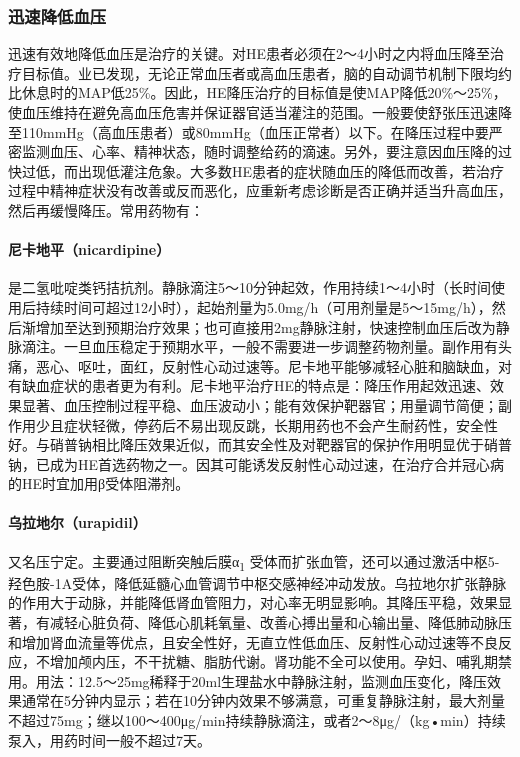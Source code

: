 \subsubsection{迅速降低血压}

迅速有效地降低血压是治疗的关键。对HE患者必须在2～4小时之内将血压降至治疗目标值。业已发现，无论正常血压者或高血压患者，脑的自动调节机制下限均约比休息时的MAP低25\%。因此，HE降压治疗的目标值是使MAP降低20\%～25\%，使血压维持在避免高血压危害并保证器官适当灌注的范围。一般要使舒张压迅速降至110mmHg（高血压患者）或80mmHg（血压正常者）以下。在降压过程中要严密监测血压、心率、精神状态，随时调整给药的滴速。另外，要注意因血压降的过快过低，而出现低灌注危象。大多数HE患者的症状随血压的降低而改善，若治疗过程中精神症状没有改善或反而恶化，应重新考虑诊断是否正确并适当升高血压，然后再缓慢降压。常用药物有：

\paragraph{尼卡地平（nicardipine）}

是二氢吡啶类钙拮抗剂。静脉滴注5～10分钟起效，作用持续1～4小时（长时间使用后持续时间可超过12小时），起始剂量为5.0mg/h（可用剂量是5～15mg/h），然后渐增加至达到预期治疗效果；也可直接用2mg静脉注射，快速控制血压后改为静脉滴注。一旦血压稳定于预期水平，一般不需要进一步调整药物剂量。副作用有头痛，恶心、呕吐，面红，反射性心动过速等。尼卡地平能够减轻心脏和脑缺血，对有缺血症状的患者更为有利。尼卡地平治疗HE的特点是：降压作用起效迅速、效果显著、血压控制过程平稳、血压波动小；能有效保护靶器官；用量调节简便；副作用少且症状轻微，停药后不易出现反跳，长期用药也不会产生耐药性，安全性好。与硝普钠相比降压效果近似，而其安全性及对靶器官的保护作用明显优于硝普钠，已成为HE首选药物之一。因其可能诱发反射性心动过速，在治疗合并冠心病的HE时宜加用β受体阻滞剂。

\paragraph{乌拉地尔（urapidil）}

又名压宁定。主要通过阻断突触后膜α\textsubscript{1}
受体而扩张血管，还可以通过激活中枢5-羟色胺-1A受体，降低延髓心血管调节中枢交感神经冲动发放。乌拉地尔扩张静脉的作用大于动脉，并能降低肾血管阻力，对心率无明显影响。其降压平稳，效果显著，有减轻心脏负荷、降低心肌耗氧量、改善心搏出量和心输出量、降低肺动脉压和增加肾血流量等优点，且安全性好，无直立性低血压、反射性心动过速等不良反应，不增加颅内压，不干扰糖、脂肪代谢。肾功能不全可以使用。孕妇、哺乳期禁用。用法：12.5～25mg稀释于20ml生理盐水中静脉注射，监测血压变化，降压效果通常在5分钟内显示；若在10分钟内效果不够满意，可重复静脉注射，最大剂量不超过75mg；继以100～400μg/min持续静脉滴注，或者2～8μg/（kg•min）持续泵入，用药时间一般不超过7天。

